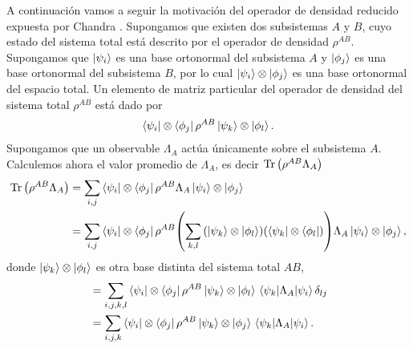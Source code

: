 A continuación vamos a seguir la motivación del operador 
de densidad reducido expuesta por Chandra \cite{chandra2013quantum}. 
Supongamos que existen dos subsistemas $A$ y $B$, cuyo estado del 
sistema total está 
descrito por el operador de densidad $\rho^{AB}$. Supongamos que 
$\ket{\psi_i}$ es una base ortonormal 
del subsistema $A$ y $\ket{\phi_j}$ es
una base ortonormal del subsistema $B$, 
por lo cual $\ket{\psi_i}\otimes \ket{\phi_j}$
es una base ortonormal del espacio total. Un elemento de matriz particular 
del operador de densidad del sistema total $\rho^{AB}$ está dado por
\begin{align}
	\bra{\psi_i}\otimes\bra{\phi_j}\rho^{AB}\ket{\psi_k}\otimes\ket{\phi_l}.
\end{align}
Supongamos que un observable $\Lambda_A$ actúa únicamente sobre el 
subsistema $A$. Calculemos ahora el valor promedio de $\Lambda_A$, es decir
$\Tr\qty(\rho^{AB}\Lambda_A)$
\begin{align}
	\Tr \qty(\rho^{AB}\Lambda_A) &= \sum _{i,j} 
	\bra{\psi_i}\otimes\bra{\phi_j}\rho^{AB}\Lambda_A\ket{\psi_i}\otimes\ket{\phi_j} \\
	&= \sum _{i,j} 
	\bra{\psi_i}\otimes\bra{\phi_j}\rho^{AB}
	\qty(\sum _{k,l} \qty(\ket{\psi_k}\otimes\ket{\phi_l})
	\qty(\bra{\psi_k}\otimes\bra{\phi_l}))
	\Lambda_A\ket{\psi_i}\otimes\ket{\phi_j},
\end{align}
donde $\ket{\psi_k}\otimes\ket{\phi_l}$ es otra base distinta  
del sistema total $AB$,
\begin{align}
	&= \sum _{i,j,k,l} 
	\bra{\psi_i}\ten\bra{\phi_j}\rho^{AB}\ket{\psi_k}\ten\ket{\phi_l}
	\matrixel{\psi_k}{\Lambda_A}{\psi_i}\delta _{lj} \\
	&= \sum _{i,j,k} 
	\bra{\psi_i}\ten\bra{\phi_j}\rho^{AB}\ket{\psi_k}\ten\ket{\phi_j}
	\matrixel{\psi_k}{\Lambda_A}{\psi_i}. \label{eq:almost-reducedRho}
\end{align}
